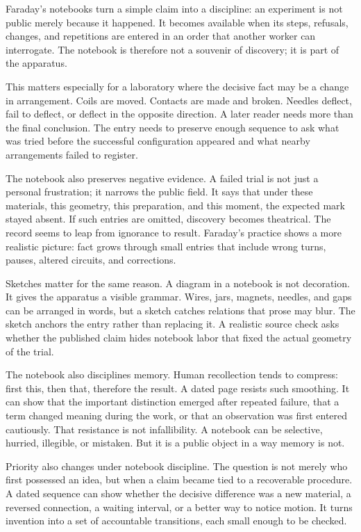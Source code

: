 Faraday's notebooks turn a simple claim into a discipline: an experiment
is not public merely because it happened. It becomes available when its
steps, refusals, changes, and repetitions are entered in an order that
another worker can interrogate. The notebook is therefore not a souvenir
of discovery; it is part of the apparatus.

This matters especially for a laboratory where the decisive fact may be a
change in arrangement. Coils are moved. Contacts are made and broken.
Needles deflect, fail to deflect, or deflect in the opposite direction.
A later reader needs more than the final conclusion. The entry needs to
preserve enough sequence to ask what was tried before the successful
configuration appeared and what nearby arrangements failed to register.

The notebook also preserves negative evidence. A failed trial is not just
a personal frustration; it narrows the public field. It says that under
these materials, this geometry, this preparation, and this moment, the
expected mark stayed absent. If such entries are omitted, discovery
becomes theatrical. The record seems to leap from ignorance to result.
Faraday's practice shows a more realistic picture: fact grows through
small entries that include wrong turns, pauses, altered circuits, and
corrections.

Sketches matter for the same reason. A diagram in a notebook is not
decoration. It gives the apparatus a visible grammar. Wires, jars,
magnets, needles, and gaps can be arranged in words, but a sketch catches
relations that prose may blur. The sketch anchors the entry rather than
replacing it. A realistic source check asks whether the published claim
hides notebook labor that fixed the actual geometry of the trial.

The notebook also disciplines memory. Human recollection tends to
compress: first this, then that, therefore the result. A dated page
resists such smoothing. It can show that the important distinction
emerged after repeated failure, that a term changed meaning during the
work, or that an observation was first entered cautiously. That
resistance is not infallibility. A notebook can be selective, hurried,
illegible, or mistaken. But it is a public object in a way memory is not.

Priority also changes under notebook discipline. The question is not
merely who first possessed an idea, but when a claim became tied to a
recoverable procedure. A dated sequence can show whether the decisive
difference was a new material, a reversed connection, a waiting interval,
or a better way to notice motion. It turns invention into a set of
accountable transitions, each small enough to be checked.

